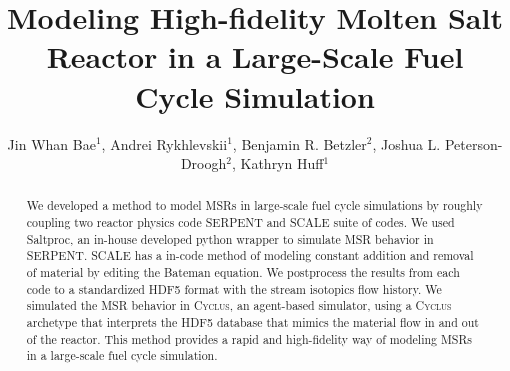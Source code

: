 \documentclass{elsarticle}
\newcommand{\Cyclus}{\textsc{Cyclus}\xspace}%
\begin{document}
\begin{frontmatter}

\title{Modeling High-fidelity Molten Salt Reactor in a Large-Scale Fuel Cycle Simulation}
\author{Jin Whan Bae$^{1}$, Andrei Rykhlevskii$^{1}$, Benjamin R. Betzler$^{2}$, Joshua L. Peterson-Droogh$^{2}$, Kathryn Huff$^{1}$}
\address{$^{1}$Dept. of Nuclear, Plasma, and Radiological Engineering, University of Illinois at Urbana-Champaign, Urbana, IL \\ $^{2}$Oak Ridge National Laboratory, Oak Ridge, TN }

\begin{abstract}
We developed a method to model \glspl{MSR} in large-scale fuel cycle
simulations by roughly coupling two reactor physics code SERPENT
and SCALE suite of codes. We used Saltproc, an in-house developed
python wrapper to simulate \gls{MSR} behavior in SERPENT. SCALE
has a in-code method of modeling constant addition and removal
of material by editing the Bateman equation. We postprocess the
results from each code to a standardized HDF5 format with
the stream isotopics flow history. We simulated the \gls{MSR}
behavior in \Cyclus, an agent-based simulator, using a \Cyclus archetype
that interprets the HDF5 database that mimics the material flow in and
out of the reactor. This method provides a rapid and high-fidelity
way of modeling \glspl{MSR} in a large-scale fuel cycle simulation.
\end{abstract}

\end{frontmatter}

	








\end{document}
